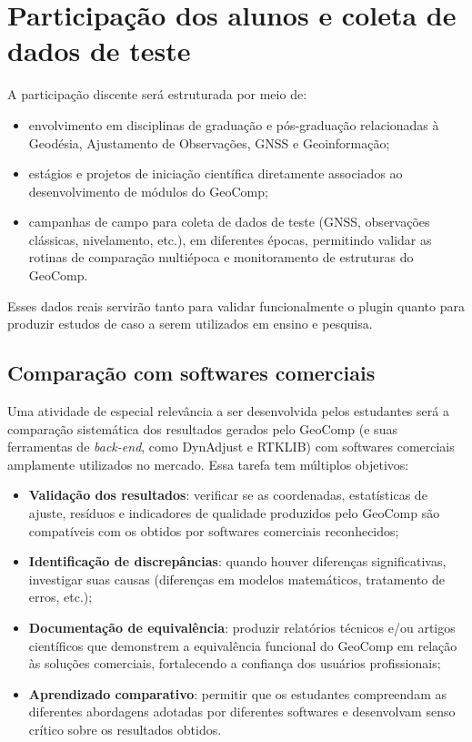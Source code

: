 \documentclass[
        12pt,                           %
        openright,                      %
        oneside,
        a4paper,                        %
        chapter=TITLE,         %
        section=TITLE,         %
        subsection=Title,      %
        english,                        %
        portugues,                      %
        ]{abntex2}
\begin{document}
\section{Participação dos alunos e coleta de dados de teste}

A participação discente será estruturada por meio de:

\begin{itemize}
    \item envolvimento em disciplinas de graduação e pós-graduação relacionadas à Geodésia, Ajustamento de Observações, GNSS e Geoinformação;
    \item estágios e projetos de iniciação científica diretamente associados ao desenvolvimento de módulos do GeoComp;
    \item campanhas de campo para coleta de dados de teste (GNSS, observações clássicas, nivelamento, etc.), em diferentes épocas, permitindo validar as rotinas de comparação multiépoca e monitoramento de estruturas do GeoComp.
\end{itemize}

Esses dados reais servirão tanto para validar funcionalmente o plugin quanto para produzir estudos de caso a serem utilizados em ensino e pesquisa.

\subsection{Comparação com softwares comerciais}

Uma atividade de especial relevância a ser desenvolvida pelos estudantes será a comparação sistemática dos resultados gerados pelo GeoComp (e suas ferramentas de \textit{back-end}, como DynAdjust e RTKLIB) com softwares comerciais amplamente utilizados no mercado. Essa tarefa tem múltiplos objetivos:

\begin{itemize}
    \item \textbf{Validação dos resultados}: verificar se as coordenadas, estatísticas de ajuste, resíduos e indicadores de qualidade produzidos pelo GeoComp são compatíveis com os obtidos por softwares comerciais reconhecidos;
    \item \textbf{Identificação de discrepâncias}: quando houver diferenças significativas, investigar suas causas (diferenças em modelos matemáticos, tratamento de erros, etc.);
    \item \textbf{Documentação de equivalência}: produzir relatórios técnicos e/ou artigos científicos que demonstrem a equivalência funcional do GeoComp em relação às soluções comerciais, fortalecendo a confiança dos usuários profissionais;
    \item \textbf{Aprendizado comparativo}: permitir que os estudantes compreendam as diferentes abordagens adotadas por diferentes softwares e desenvolvam senso crítico sobre os resultados obtidos.
\end{itemize}
\end{document}
